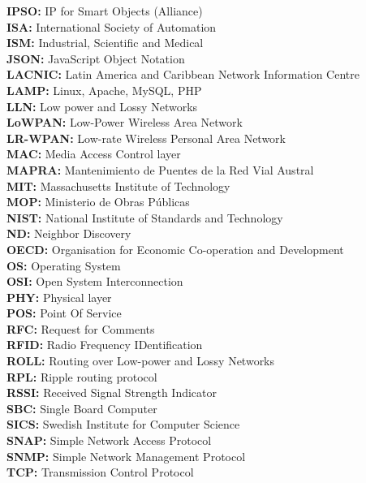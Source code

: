 \begin{spacing}{1.2}
\textbf{IPSO:} IP for Smart Objects (Alliance)\\
\textbf{ISA:} International Society of Automation\\
\textbf{ISM:} Industrial, Scientific and Medical\\
\textbf{JSON:} JavaScript Object Notation\\
\textbf{LACNIC:} Latin America and Caribbean Network Information Centre\\
\textbf{LAMP:} Linux, Apache, MySQL, PHP\\
\textbf{LLN:} Low power and Lossy Networks\\
\textbf{LoWPAN:} Low-Power Wireless Area Network\\
\textbf{LR-WPAN:} Low-rate Wireless Personal Area Network\\
\textbf{MAC:} Media Access Control layer\\ 
\textbf{MAPRA:} Mantenimiento de Puentes de la Red Vial Austral\\
\textbf{MIT:} Massachusetts Institute of Technology\\
\textbf{MOP:} Ministerio de Obras Públicas\\
\textbf{NIST:} National Institute of Standards and Technology\\
\textbf{ND:} Neighbor Discovery\\
\textbf{OECD:} Organisation for Economic Co-operation and Development\\
\textbf{OS:} Operating System\\
\textbf{OSI:} Open System Interconnection\\
\textbf{PHY:} Physical layer\\
\textbf{POS:} Point Of Service\\
\textbf{RFC:} Request for Comments\\
\textbf{RFID:} Radio Frequency IDentification\\
\textbf{ROLL:} Routing over Low-power and Lossy Networks\\
\textbf{RPL:} Ripple routing protocol\\
\textbf{RSSI:} Received Signal Strength Indicator\\
\textbf{SBC:} Single Board Computer\\
\textbf{SICS:} Swedish Institute for Computer Science\\
\textbf{SNAP:} Simple Network Access Protocol\\
\textbf{SNMP:} Simple Network Management Protocol\\
\textbf{TCP:} Transmission Control Protocol\\

\end{spacing}
